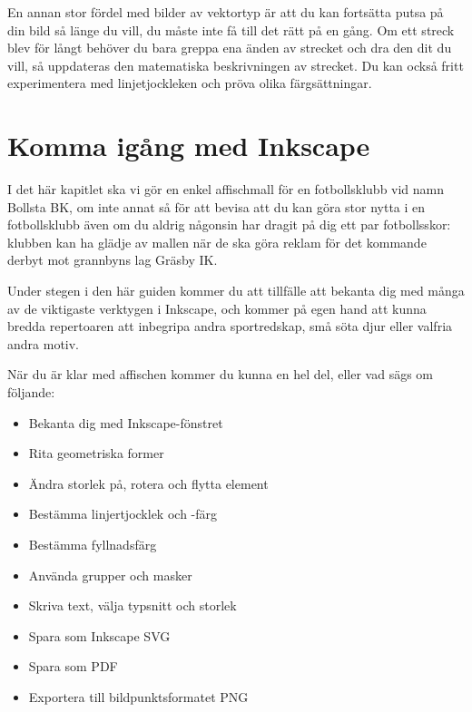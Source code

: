 \documentclass[a4paper,final]{memoir} %
\begin{document}

En annan stor fördel med bilder av vektortyp är att du kan fortsätta putsa på din bild så länge du vill, du måste inte få till det rätt på en gång. Om ett streck blev för långt behöver du bara greppa ena änden av strecket och dra den dit du vill, så uppdateras den matematiska beskrivningen av strecket. Du kan också fritt experimentera med linjetjockleken och pröva olika färgsättningar.

\section{Komma igång med Inkscape}

I det här kapitlet ska vi gör en enkel affischmall för en fotbollsklubb vid namn Bollsta BK, om inte annat så för att bevisa att du kan göra stor nytta i en fotbollsklubb även om du aldrig någonsin har dragit på dig ett par fotbollsskor: klubben kan ha glädje av mallen när de ska göra reklam för det kommande derbyt mot grannbyns lag Gräsby IK. 


Under stegen i den här guiden kommer du att tillfälle att bekanta dig med många av de viktigaste verktygen i Inkscape, och kommer på egen hand att kunna bredda repertoaren att inbegripa andra sportredskap, små söta djur eller valfria andra motiv.

När du är klar med affischen kommer du kunna en hel del, eller vad sägs om följande:

\begin{itemize}

\item Bekanta dig med Inkscape-fönstret
\item Rita geometriska former
\item Ändra storlek på, rotera och flytta element
\item Bestämma linjertjocklek och -färg
\item Bestämma fyllnadsfärg
\item Använda grupper och masker
\item Skriva text, välja typsnitt och storlek
\item Spara som Inkscape SVG 
\item Spara som PDF
\item Exportera till bildpunktsformatet PNG

\end{itemize}
\end{document}

